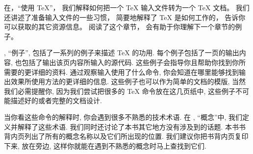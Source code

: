 在，``使用 \TeX''，
我们解释如何把一个 \TeX{} 输入文件转为一个 \TeX{} 文档。
我们还讲述了准备输入文件的一些习惯，
简要地解释了 \TeX{} 是如何工作的， 告诉你可以获取的其它资源信息。
阅读了这个章节， 会有助于你理解下一个章节的例子。


, ``例子'',
包括了一系列的例子来描述 \TeX{} 的功用.
每个例子包括了一页的输出内容, 也包括了输出该页内容所输入的源代码.
这些例子会指导你且帮助你找到你所需要的更详细的资料.
通过观察输入使用了什么命令,
你会知道在哪里能够找到输出效果所使用方法的更详细的信息.
这些例子也可以作为简单的文档的模版, 当然我们必需提醒你,
因为我们尝试把很多的 \TeX{} 命令放在这几页纸中,
这些例子不可能描述好的或者完整的文档设计.


当你看这些命令的解释时, 你会遇到很多不熟悉的技术术语.
在 , ``概念''中, 我们定义并解释了这些术语.
我们同时还讨论了本书其它地方没有涉及到的话题.
本书书背内页列出了所有的概念名称以及它们所出现的位置.
我们建议你把书背内页复印下来, 放在旁边,
这样你就能在遇到不熟悉的概念时马上查找到它们.



